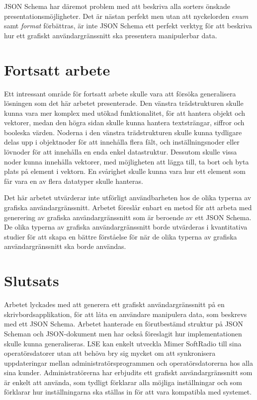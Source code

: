 JSON Schema har däremot problem med att beskriva alla sorters önskade presentationsmöjligheter. Det är nästan perfekt men utan att nyckelorden \textit{enum} samt \textit{format} förbättras, är inte JSON Schema ett perfekt verktyg för att beskriva hur ett grafiskt användargränssnitt ska presentera manipulerbar data.

\newpage

\section{Fortsatt arbete}
\label{sec:slutsats:fortsatt-arbete}
Ett intressant område för fortsatt arbete skulle vara att försöka generalisera lösningen som det här arbetet presenterade. Den vänstra trädstrukturen skulle kunna vara mer komplex med utökad funktionalitet, för att hantera objekt och vektorer, medan den högra sidan skulle kunna hantera textsträngar, siffror och booleska värden. Noderna i den vänstra trädstrukturen skulle kunna tydligare delas upp i objektnoder för att innehålla flera fält, och inställningsnoder eller lövnoder för att innehålla en enda enkel datastruktur. Dessutom skulle vissa noder kunna innehålla vektorer, med möjligheten att lägga till, ta bort och byta plats på element i vektorn. En svårighet skulle kunna vara hur ett element som får vara en av flera datatyper skulle hanteras.

Det här arbetet utvärderar inte utförligt användbarheten hos de olika typerna av grafiska användargränssnitt. Arbetet föreslår enbart en metod för att arbeta med generering av grafiska användargränssnitt som är beroende av ett JSON Schema. De olika typerna av grafiska användargränssnitt borde utvärderas i kvantitativa studier för att skapa en bättre förståelse för när de olika typerna av grafiska användargränssnitt ska borde användas.


\section{Slutsats}
\label{sec:slutsats:slutsats}
Arbetet lyckades med att generera ett grafiskt användargränssnitt på en skrivbordsapplikation, för att låta en användare manipulera data, som beskrevs med ett JSON Schema. Arbetet hanterade en förutbestämd struktur på JSON Scheman och JSON-dokument men har också föreslagit hur implementationen skulle kunna generaliseras. LSE kan enkelt utveckla Mimer SoftRadio till sina operatörsdatorer utan att behöva bry sig mycket om att synkronisera uppdateringar mellan administratörsprogrammen och operatörsdatorerna hos alla sina kunder. Administratörerna har erbjudits ett grafiskt användargränssnitt som är enkelt att använda, som tydligt förklarar alla möjliga inställningar och som förklarar hur inställningarna ska ställas in för att vara kompatibla med systemet.

